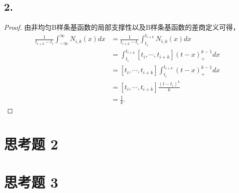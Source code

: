 \documentclass[utf8]{ctexart}
\begin{document}
\subsection*{2.}
\begin{proof}
    由非均匀B样条基函数的局部支撑性以及B样条基函数的差商定义可得，
    \begin{equation}
        \begin{aligned}
            \frac{1}{t_{i+k}-t_i}\int_{-\infty}^{\infty}N_{i,k}(x)dx &=  \frac{1}{t_{i+k}-t_i}\int_{t_{i}}^{t_{i+k}}N_{i,k}(x)dx\\
            &= \int_{t_{i}}^{t_{i+k}}[t_i,\cdots,t_{i+k}](t-x)_+^{k-1}dx\\
            &= [t_i,\cdots,t_{i+k}]\int_{t_{i}}^{t_{i+k}}(t-x)_+^{k-1}dx\\
            &= [t_i,\cdots,t_{i+k}]\frac{(t-t_i)^k}{k}\\
            &= \frac{1}{k}.
        \end{aligned}
    \end{equation}
\end{proof}

\section*{思考题 2}


\section*{思考题 3}
\end{document}
